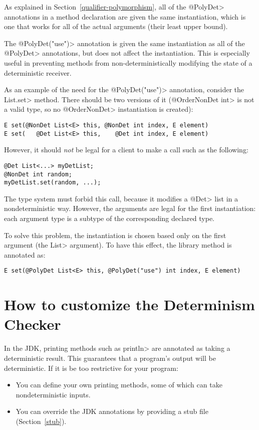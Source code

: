 As explained in Section~\ref{qualifier-polymorphism},
all of the \<@PolyDet> annotations in a method declaration are given the same
instantiation, which is one that works for all of the actual arguments
(their least upper bound).

The \<@PolyDet("use")> annotation is given the same instantiation as all of the
\<@PolyDet> annotations, but does not affect the instantiation. This is especially
useful in preventing methods from non-deterministically modifying the
state of a deterministic receiver.

As an example of the need for the \<@PolyDet("use")> annotation, consider the
\<List.set> method.  There should be two versions of it (\<@OrderNonDet
int> is not a valid type, so no \<@OrderNonDet> instantiation is created):

\begin{Verbatim}
E set(@NonDet List<E> this, @NonDet int index, E element)
E set(   @Det List<E> this,    @Det int index, E element)
\end{Verbatim}

\noindent
However, it should \emph{not} be legal for a client to make a call such as
the following:

\begin{Verbatim}
@Det List<...> myDetList;
@NonDet int random;
myDetList.set(random, ...);
\end{Verbatim}

\noindent
The type system must forbid this call, because it modifies a
\<@Det> list in a nondeterministic way.
However, the arguments are legal for the first instantiation:
each argument type is a subtype of the corresponding declared type.

To solve this problem, the instantiation is chosen based only on the first
argument (the \<List> argument).  To have this effect, the library method
is annotated as:

\begin{Verbatim}
E set(@PolyDet List<E> this, @PolyDet("use") int index, E element)
\end{Verbatim}



\section{How to customize the Determinism Checker\label{determinism-customization}}

In the JDK, printing methods such as \<println> are annotated as taking a
deterministic result.  This guarantees that a program's output will be
deterministic.  If it is be too restrictive for your program:
\begin{itemize}
\item
  You can define your own printing methods, some of which can take
  nondeterministic inputs.
\item
  You can override the JDK annotations by providing a stub file
  (Section~\ref{stub}).
\end{itemize}


